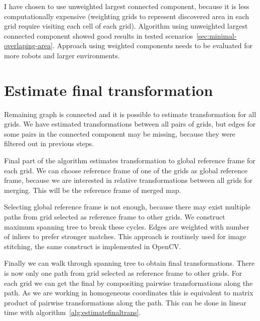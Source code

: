 I have chosen to use unweighted largest connected component, because it is less computationally expensive (weighting grids to represent discovered area in each grid require visiting each cell of each grid). Algorithm using unweighted largest connected component showed good results in tested scenarios~\ref{sec:minimal-overlaping-area}. Approach using weighted components needs to be evaluated for more robots and larger environments.


\section{Estimate final transformation} %
\label{sec:estimatefinaltransformation}

Remaining graph is connected and it is possible to estimate transformation for all grids. We have estimated transformations between all pairs of grids, but edges for some pairs in the connected component may be missing, because they were filtered out in previous steps.

Final part of the algorithm estimates transformation to global reference frame for each grid. We can choose reference frame of one of the grids as global reference frame, because we are interested in relative transformations between all grids for merging. This will be the reference frame of merged map.

Selecting global reference frame is not enough, because there may exist multiple paths from grid selected as reference frame to other grids. We construct maximum spanning tree to break these cycles. Edges are weighted with number of inliers to prefer stronger matches. This approach is routinely used for image stitching, the same construct is implemented in \gls{OpenCV}.

Finally we can walk through spanning tree to obtain final transformations. There is now only one path from grid selected as reference frame to other grids. For each grid we can get the final by compositing pairwise transformations along the path. As we are working in homogeneous coordinates this is equivalent to matrix product of pairwise transformations along the path. This can be done in linear time with algorithm~\ref{alg:estimatefinaltrans}.

